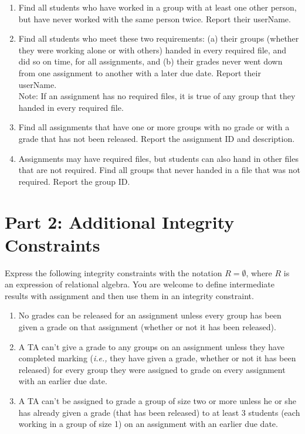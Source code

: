 \documentclass{article}
\begin{document}
\begin{enumerate}
\item   %
Find all students who have worked in a group with at least one other person, 
but have never worked with the same person
twice.
Report their userName.

\item   %
Find all students who meet these two requirements:
(a) their groups (whether they were working alone or with others)
handed in every required file, and did so on time, for all assignments, and
(b) their grades never went down from one assignment to another with a later due date.
Report their userName.\\
Note: If an assignment has no required files, it is true of any group that they handed in every required file.

\item   %
Find all assignments that have one or more groups with no grade or with a grade that has not
been released.
Report the assignment ID and description.

\item   %
Assignments may have required files, but students can also hand in other files that are not required.
Find all groups that never handed in a file that was not required.
Report the group ID.

\end{enumerate}



\section*{Part 2: Additional Integrity Constraints}

Express the following integrity constraints
with the notation $R = \emptyset$, where $R$ is an expression of relational algebra. 
You are welcome to define intermediate results with assignment
and then use them in an integrity constraint.

\begin{enumerate}

\item   %
No grades can be released for an assignment 
unless every group has been given a grade on that assignment (whether or not it has been released).

\item   %
A TA can't give a grade to any groups on an assignment unless they have completed marking 
({\it i.e.,} they have given a grade, whether or not it has been released)
for every group they were assigned to grade on every assignment with an earlier due date.

\item   %
A TA can't be assigned to grade a group of size two or more unless he or she has already 
given a grade (that has been released) to at least 3 students (each working in a group of size 1) 
on an assignment with an earlier due date.

\end{enumerate}
\end{document}
